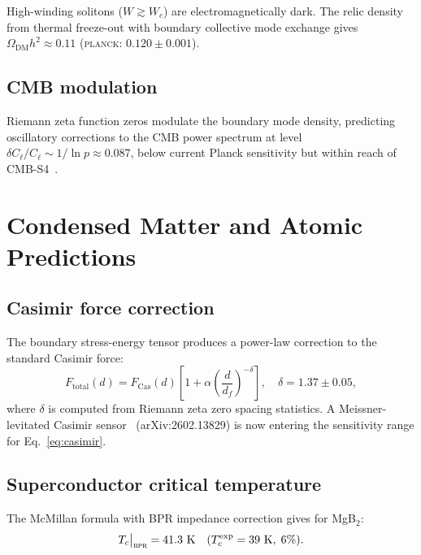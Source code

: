 \documentclass[aps,prd,twocolumn,superscriptaddress,longbibliography,nofootinbib]{revtex4-2}
\newcommand{\Wc}{W_{\!c}}
\newcommand{\bpr}{\textsc{bpr}}
\begin{document}
High-winding solitons ($W \gtrsim \Wc$) are electromagnetically dark.
The relic density from thermal freeze-out with boundary collective mode
exchange gives $\Omega_{\mathrm{DM}}h^2 \approx 0.11$
(\textsc{planck}: $0.120 \pm 0.001$).

\subsection{CMB modulation}

Riemann zeta function zeros modulate the boundary mode density, predicting
oscillatory corrections to the CMB power spectrum at level
$\delta C_\ell / C_\ell \sim 1/\ln p \approx 0.087$, below current Planck
sensitivity but within reach of CMB-S4~\cite{CMBS4}.


\section{Condensed Matter and Atomic Predictions}
\label{sec:cm}

\subsection{Casimir force correction}

The boundary stress-energy tensor produces a power-law correction to the
standard Casimir force:
\begin{equation}
F_{\mathrm{total}}(d) = F_{\mathrm{Cas}}(d)
  \left[1 + \alpha\left(\frac{d}{d_f}\right)^{-\delta}\right],
\quad \delta = 1.37 \pm 0.05,
\label{eq:casimir}
\end{equation}
where $\delta$ is computed from Riemann zeta zero spacing statistics.
A Meissner-levitated Casimir sensor~\cite{Casimir2026} (arXiv:2602.13829)
is now entering the sensitivity range for Eq.~\eqref{eq:casimir}.

\subsection{Superconductor critical temperature}

The McMillan formula with BPR impedance correction gives for MgB$_2$:
\begin{equation}
T_c\big|_{\bpr} = 41.3~\text{K}
\quad (T_c^{\text{exp}} = 39~\text{K},\; 6\%).
\end{equation}
\end{document}
